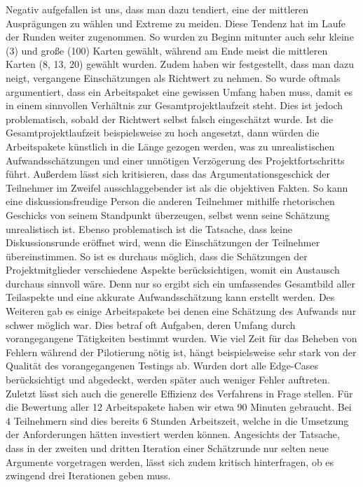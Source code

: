 Negativ aufgefallen ist uns, dass man dazu tendiert, eine der mittleren Ausprägungen zu wählen und Extreme zu meiden. Diese Tendenz hat im Laufe der Runden weiter zugenommen. So wurden zu Beginn mitunter auch sehr kleine (3) und große (100) Karten gewählt, während am Ende meist die mittleren Karten (8, 13, 20) gewählt wurden. 
Zudem haben wir festgestellt, dass man dazu neigt, vergangene Einschätzungen als Richtwert zu nehmen. So wurde oftmals argumentiert, dass ein Arbeitspaket eine gewissen Umfang haben muss, damit es in einem sinnvollen Verhältnis zur Gesamtprojektlaufzeit steht. Dies ist jedoch problematisch, sobald der Richtwert selbst falsch eingeschätzt wurde. Ist die Gesamtprojektlaufzeit beispielsweise zu hoch angesetzt, dann würden die Arbeitspakete künstlich in die Länge gezogen werden, was zu unrealistischen Aufwandsschätzungen und einer unnötigen Verzögerung des Projektfortschritts führt. 
Außerdem lässt sich kritisieren, dass das Argumentationsgeschick der Teilnehmer im Zweifel ausschlaggebender ist als die objektiven Fakten. So kann eine diskussionsfreudige Person die anderen Teilnehmer mithilfe rhetorischen Geschicks von seinem Standpunkt überzeugen, selbst wenn seine Schätzung unrealistisch ist.
Ebenso problematisch ist die Tatsache, dass keine Diskussionsrunde eröffnet wird, wenn die Einschätzungen der Teilnehmer übereinstimmen. So ist es durchaus möglich, dass die Schätzungen der Projektmitglieder verschiedene Aspekte berücksichtigen, womit ein Austausch durchaus sinnvoll wäre. Denn nur so ergibt sich ein umfassendes Gesamtbild aller Teilaspekte und eine akkurate Aufwandsschätzung kann erstellt werden.
Des Weiteren gab es einige Arbeitspakete bei denen eine Schätzung des Aufwands nur schwer möglich war. Dies betraf oft Aufgaben, deren Umfang durch vorangegangene Tätigkeiten bestimmt wurden. Wie viel Zeit für das Beheben von Fehlern während der Pilotierung nötig ist, hängt beispielsweise sehr stark von der Qualität des vorangegangenen Testings ab. Wurden dort alle Edge-Cases berücksichtigt und abgedeckt, werden später auch weniger Fehler auftreten.
Zuletzt lässt sich auch die generelle Effizienz des Verfahrens in Frage stellen. Für die Bewertung aller 12 Arbeitspakete haben wir etwa 90 Minuten gebraucht. Bei 4 Teilnehmern sind dies bereits 6 Stunden Arbeitszeit, welche in die Umsetzung der Anforderungen hätten investiert werden können. Angesichts der Tatsache, dass in der zweiten und dritten Iteration einer Schätzrunde nur selten neue Argumente vorgetragen werden, lässt sich zudem kritisch hinterfragen, ob es zwingend drei Iterationen geben muss.

